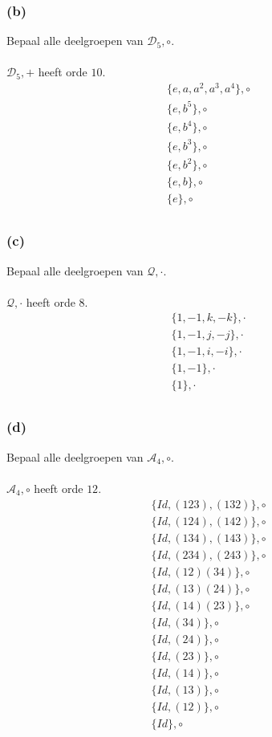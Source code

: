 \documentclass[main.tex]{subfiles}
\begin{document}
\subsubsection*{(b)}
Bepaal alle deelgroepen van $\mathcal{D}_{5},\circ$.\\\\
$\mathcal{D}_{5},+$ heeft orde $10$.
\[
\begin{array}{c}
  \{ e, a, a^{2}, a^{3}, a^{4} \},\circ\\
  \{ e, b^{5} \},\circ\\
  \{ e, b^{4} \},\circ\\
  \{ e, b^{3} \},\circ\\
  \{ e, b^{2} \},\circ\\
  \{ e, b \},\circ\\
  \{ e \},\circ\\
\end{array}
\]

\subsubsection*{(c)}
Bepaal alle deelgroepen van $\mathcal{Q},\cdot$.\\\\
$\mathcal{Q},\cdot$ heeft orde $8$.
\[
\begin{array}{c}
  \{ 1, -1, k, -k \},\cdot\\
  \{ 1, -1, j, -j \},\cdot\\
  \{ 1, -1, i, -i \},\cdot\\
  \{ 1, -1 \},\cdot\\
  \{ 1 \},\cdot\\
\end{array}
\]

\subsubsection*{(d)}
Bepaal alle deelgroepen van $\mathcal{A}_{4},\circ$.\\\\
$\mathcal{A}_{4},\circ$ heeft orde $12$.
\[
\begin{array}{c}
  \{ Id, (123), (132) \},\circ\\
  \{ Id, (124), (142) \},\circ\\
  \{ Id, (134), (143) \},\circ\\
  \{ Id, (234), (243) \},\circ\\
  \{ Id, (12)(34) \},\circ\\
  \{ Id, (13)(24) \},\circ\\
  \{ Id, (14)(23) \},\circ\\
  \{ Id, (34) \},\circ\\
  \{ Id, (24) \},\circ\\
  \{ Id, (23) \},\circ\\
  \{ Id, (14) \},\circ\\
  \{ Id, (13) \},\circ\\
  \{ Id, (12) \},\circ\\
  \{ Id \},\circ\\
\end{array}
\]
\end{document}
